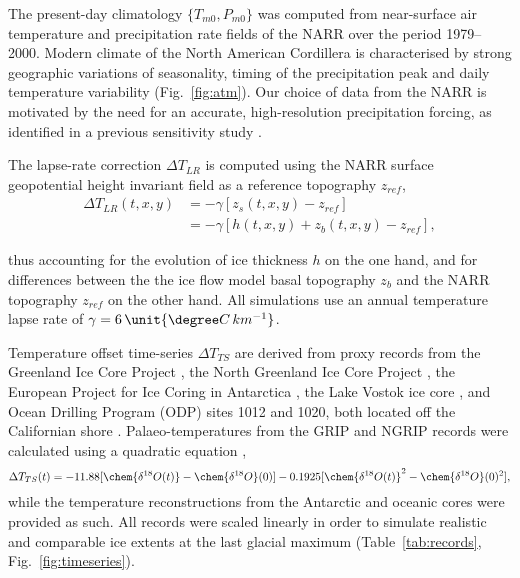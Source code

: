 \documentclass[tc, manuscript]{copernicus}
\begin{document}
The present-day climatology $\{T_{m0}, P_{m0}\}$ was computed from
near-surface air temperature and precipitation rate fields of the NARR
\citep{Mesinger.etal.2006} over the period 1979--2000. Modern climate of the
North American Cordillera is characterised by strong geographic variations of
seasonality, timing of the precipitation peak and daily temperature variability
(Fig.~\ref{fig:atm}).
Our choice of data from the NARR is motivated by the need for an accurate,
high-resolution precipitation forcing, as identified in a previous sensitivity
study \citep{Seguinot.etal.2013}.

The lapse-rate correction ${\Delta}T_{LR}$ is computed using the NARR surface
geopotential height invariant field as a reference topography $z_{ref}$,
\begin{align}
    {\Delta}T_{LR}(t, x, y) &= -\gamma [z_{s}(t, x, y)-z_{ref}] \\
                            &= -\gamma [h(t, x, y)+z_{b}(t, x, y)-z_{ref}],
\end{align}

thus accounting for the evolution of ice thickness $h$ on the one hand, and
for differences between the the ice flow model basal topography $z_{b}$ and the
NARR topography $z_{ref}$ on the other hand. All simulations use an annual temperature lapse rate of $\gamma = 6\,\unit{{\degree}C\,km^{-1}}$.

Temperature offset time-series ${\Delta}T_{TS}$ are derived from proxy records from
the Greenland Ice Core Project \citep[GRIP,][]{Dansgaard.etal.1993}, the
North Greenland Ice Core Project \citep[NGRIP,][]{Andersen.etal.2004},
the European Project for Ice Coring in Antarctica \citep[EPICA,][]
{Jouzel.etal.2007}, the Lake Vostok ice core \citep{Petit.etal.1999}, and Ocean
Drilling Program (ODP) sites 1012 and 1020, both located off the Californian
shore \citep{Herbert.etal.2001}. Palaeo-temperatures from the GRIP and NGRIP
records were calculated using a quadratic equation \citep{Johnsen.etal.1995},
\begin{equation}
    {\Delta}T_{TS}(t) = -11.88[\chem{\delta^{18}O(t)}-\chem{\delta^{18}O}(0)]
                        -0.1925[\chem{\delta^{18}O(t)}^2-\chem{\delta^{18}O}(0)^2],
\end{equation}
while the temperature reconstructions from the Antarctic and oceanic cores were
provided as such. All records were scaled linearly in
order to simulate realistic and comparable ice extents at the last
glacial maximum (Table~\ref{tab:records}, Fig.~\ref{fig:timeseries}).
\end{document}
